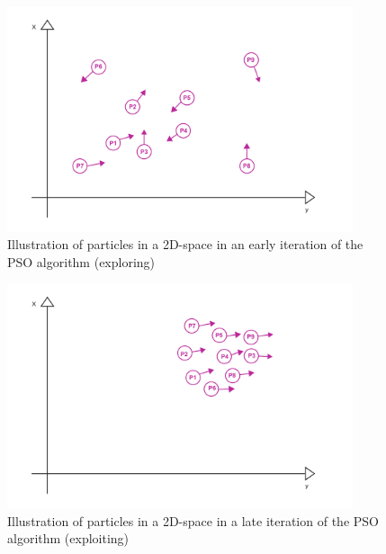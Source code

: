 \begin{figure}[H]
  \centering
  \includegraphics[width=4in]{assets/pso_diagram1.pdf}
  \caption{Illustration of particles in a 2D-space in an early iteration of the PSO algorithm (exploring)}
   \label{fig:psoBeginning}
\end{figure}

\begin{figure}[H]
  \centering
  \includegraphics[width=4in]{assets/pso_diagram2.pdf}
  \caption{Illustration of particles in a 2D-space in a late iteration of the PSO algorithm (exploiting)}
   \label{fig:psoEnd}
\end{figure}




